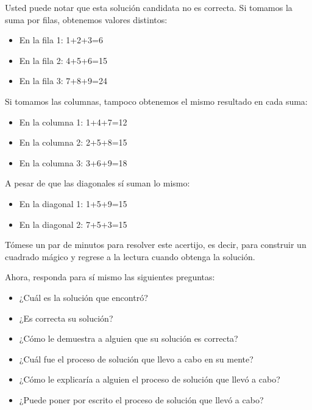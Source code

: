 Usted puede notar que esta solución candidata no es correcta. Si tomamos la suma por filas, obtenemos valores distintos:

\begin{itemize}

\item En la fila 1: 1+2+3=6
\item En la fila 2: 4+5+6=15
\item En la fila 3: 7+8+9=24

\end{itemize}

Si tomamos las columnas, tampoco obtenemos el mismo resultado en 
cada suma:


\begin{itemize}

\item En la columna 1: 1+4+7=12
\item En la columna 2: 2+5+8=15
\item En la columna 3: 3+6+9=18

\end{itemize}

A pesar de que las diagonales sí suman lo mismo:

\begin{itemize}

\item En la diagonal 1: 1+5+9=15
\item En la diagonal 2: 7+5+3=15

\end{itemize}

Tómese un par de minutos para resolver este acertijo, es decir, para construir un cuadrado mágico y regrese a la lectura cuando
obtenga la solución. 

Ahora, responda para sí mismo las siguientes preguntas:

\begin{itemize}

\item ¿Cuál es la solución que encontró?
\item ¿Es correcta su solución?
\item ¿Cómo le demuestra a alguien que su solución es
correcta?
\item ¿Cuál fue el proceso de solución que llevo a cabo en su 
mente?
\item ¿Cómo le explicaría a alguien el proceso de solución que
llevó a cabo?
\item ¿Puede poner por escrito el proceso de solución que llevó
a cabo?
\end{itemize}

